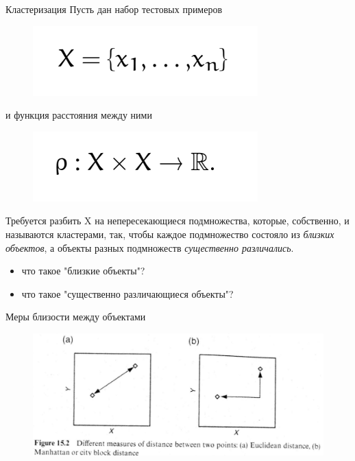 \documentclass{beamer}
\begin{document}
\begin{frame}{Кластеризация}
Пусть дан набор тестовых примеров
\begin{figure}[h]
\centering
\includegraphics[scale=0.4]{images/lec07-pic02.png}
\end{figure}
и функция расстояния между ними
\begin{figure}[h]
\centering
\includegraphics[scale=0.4]{images/lec07-pic03.png}
\end{figure}
Требуется разбить X на непересекающиеся подмножества, которые, собственно, и называются кластерами, так, чтобы каждое подмножество состояло из \textit{близких объектов}, а объекты разных подмножеств \textit{существенно различались}.
\begin{itemize}
\item что такое "близкие объекты"?
\item что такое "существенно различающиеся объекты"?
\end{itemize}
\end{frame}

\begin{frame}{Меры близости между объектами}
\begin{figure}[h]
\centering
\includegraphics[scale=0.3]{images/lec07-pic07.png}
\end{figure}
\end{frame}
\end{document}

